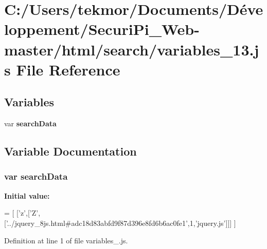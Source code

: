 \section{C\+:/\+Users/tekmor/\+Documents/\+Développement/\+Securi\+Pi\+\_\+\+Web-\/master/html/search/variables\+\_\+13.js File Reference}
\label{variables__13_8js}
\subsection*{Variables}
\begin{DoxyCompactItemize}
\item 
var {\bf search\+Data}
\end{DoxyCompactItemize}


\subsection{Variable Documentation}
\subsubsection[{search\+Data}]{\setlength{\rightskip}{0pt plus 5cm}var search\+Data}\label{variables__13_8js_ad01a7523f103d6242ef9b0451861231e}
{\bfseries Initial value\+:}
\begin{DoxyCode}
=
[
  [\textcolor{charliteral}{'z'},[\textcolor{charliteral}{'Z'},[\textcolor{stringliteral}{'../jquery\_8js.html#adc18d83abfd9f87d396e8fd6b6ac0fe1'},1,\textcolor{stringliteral}{'jquery.js'}]]]
]
\end{DoxyCode}


Definition at line 1 of file variables\+\_.\+js.

